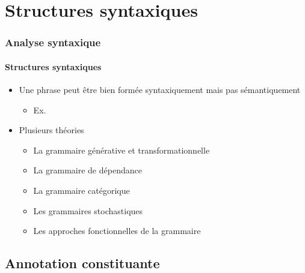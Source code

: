 \documentclass[xcolor=table]{beamer}
\begin{document}
\section{Structures syntaxiques}

\begin{frame}
\frametitle{Analyse syntaxique}
\framesubtitle{Structures syntaxiques}

\begin{itemize}
	\item Une phrase peut être bien formée syntaxiquement mais pas sémantiquement 
	\begin{itemize}
		\item Ex. 
	\end{itemize}
	\item Plusieurs théories 
	\begin{itemize}
		\item La grammaire générative et transformationnelle 
		\item La grammaire de dépendance 
		\item La grammaire catégorique
		\item Les grammaires stochastiques
		\item Les approches fonctionnelles de la grammaire
	\end{itemize}
	
\end{itemize}

\end{frame}


\subsection{Annotation constituante}
\end{document}

